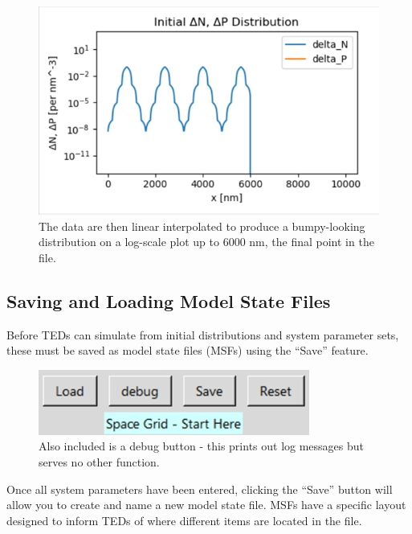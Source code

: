 \documentclass[11pt,letterpaper,titlepage]{article}
\begin{document}
		\begin{figure}[H]
			\label{fig:listupload_example_plot}
			\centering
			\includegraphics[scale=1]{"listupload_example_plot"}
			\caption{The data are then linear interpolated to produce a bumpy-looking distribution on a log-scale plot up to 6000 nm, the final point in the file.}
		\end{figure}
	
		\subsection{Saving and Loading Model State Files}
		
		\par Before TEDs can simulate from initial distributions and system parameter sets, these must be saved as model state files (MSFs) using the “Save” feature.
		
		\begin{figure}[H]
			\label{fig:save_menu}
			\centering
			\includegraphics[scale=1]{"save_menu"}
			\caption{Also included is a debug button - this prints out log messages but serves no other function.}
		\end{figure}
	
		\par Once all system parameters have been entered, clicking the “Save” button will allow you to create and name a new model state file. MSFs have a specific layout designed to inform TEDs of where different items are located in the file.
		
\end{document}
